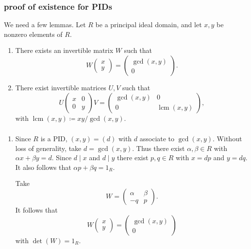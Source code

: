 \documentclass{beamer}
\DeclareMathOperator{\lcm}{lcm}
\begin{document}
\begin{frame}
  \frametitle{proof of existence for PIDs}

  We need a few lemmas. Let $R$ be a principal ideal domain, and let $x,y$ be nonzero elements of $R$. \begin{enumerate}
    \item There exists an invertible matrix $W$ such that \[W\begin{pmatrix}
      x \\ y
    \end{pmatrix} = \begin{pmatrix}
      \gcd(x,y) \\ 0
    \end{pmatrix}.\]
    \item There exist invertible matrices $U,V$ such that \[U\begin{pmatrix}
      x & 0 \\ 0 & y
    \end{pmatrix}V = \begin{pmatrix}
      \gcd(x,y) & 0 \\ 0 & \lcm(x,y)
    \end{pmatrix},\] with $\lcm(x,y) \coloneqq xy/\gcd(x,y)$.
  \end{enumerate}
  
\end{frame}

\begin{frame}
  \frametitle{}

  \begin{enumerate}
    \item Since $R$ is a PID, $(x,y) = (d)$ with $d$ associate to $\gcd(x,y)$. Without loss of generality, take $d = \gcd(x,y)$. Thus there exist $\alpha, \beta\in R$ with $\alpha x + \beta y = d$. Since $d\mid x$ and $d\mid y$ there exist $p,q\in R$ with $x = dp$ and $y = dq$. It also follows that $\alpha p + \beta q  = 1_R$.
    
    Take \[W = \begin{pmatrix}
      \alpha & \beta \\ -q & p
    \end{pmatrix}.\] It follows that \[W\begin{pmatrix}
      x \\ y
    \end{pmatrix} = \begin{pmatrix}
      \gcd(x,y) \\ 0
    \end{pmatrix}\] with $\det(W) = 1_R$.
  \end{enumerate}

\end{frame}
\end{document}

